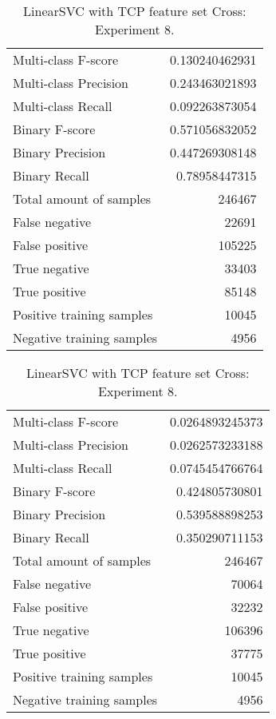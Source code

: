 \begin{table}[H]
\begin{minipage}{0.5\textwidth}
\caption{LinearSVC with TCP feature set Cross: Experiment 7.}
\centering
\begin{tabular}{l r}
\toprule
Multi-class F-score & 0.130240462931 \\
Multi-class Precision & 0.243463021893 \\
Multi-class Recall & 0.092263873054 \\
\midrule
Binary F-score & 0.571056832052 \\
Binary Precision & 0.447269308148 \\
Binary Recall & 0.78958447315 \\
\midrule
Total amount of samples & 246467 \\
False negative & 22691 \\
False positive & 105225 \\
True negative & 33403 \\
True positive & 85148 \\
\midrule
Positive training samples & 10045 \\
Negative training samples & 4956 \\
\bottomrule
\end{tabular}
\end{minipage}
\hfillx
\begin{minipage}{0.5\textwidth}
\caption{LinearSVC with TCP feature set Cross: Experiment 8.}
\centering
\begin{tabular}{l r}
\toprule
Multi-class F-score & 0.0264893245373 \\
Multi-class Precision & 0.0262573233188 \\
Multi-class Recall & 0.0745454766764 \\
\midrule
Binary F-score & 0.424805730801 \\
Binary Precision & 0.539588898253 \\
Binary Recall & 0.350290711153 \\
\midrule
Total amount of samples & 246467 \\
False negative & 70064 \\
False positive & 32232 \\
True negative & 106396 \\
True positive & 37775 \\
\midrule
Positive training samples & 10045 \\
Negative training samples & 4956 \\
\bottomrule
\end{tabular}
\end{minipage}
\end{table}
